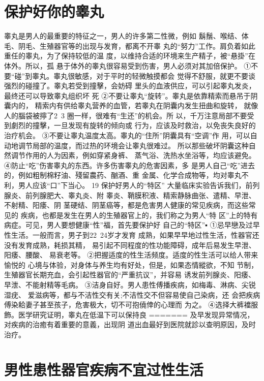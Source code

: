 \documentclass[12pt,UTF8]{ctexbook}
\begin{document}
\section{保护好你的睾丸}
睾丸是男人的最重要的特征之一，男人的许多第二性微，例如
鬍鬚、喉结、体毛、阴毛、生殖器官等的出现与发育，都离不开睾
丸的“努力”工作。肩负着如此重任的睾丸，为了保持较低的温
度，以维持合适的环境来生产精子，被“悬掛”在体外。所以，孤
悬于体外的睾丸很容易受到伤害，男人必须对其加倍保护。
①不要“碰”到睾丸。睾丸很敏感，对于平时的轻微触摸都会
觉得不舒服，就更不要谈强烈的碰撞了。睾丸若受到撞擊，会妨碍
里头的血液供应，可以引起睾丸发炎，最终还可以导致睾丸组织坏
死
②不要让睾丸“旋转”。睾丸是依靠精索而悬吊于阴囊内的，
精索内有供给睾丸营养的血管，若睾丸在阴囊内发生扭曲和旋转，
就像人的腦袋被擰了2~3 圈一样，很难有“生还”的机会。所
以，千万注意局部不要受到劇烈的撞擊，一旦发现有旋转的倾向或
行为，应该及时救治，以免丧失良好的治疗机会。
③不要让睾丸温度太高。睾丸的“住所”阴囊具有“空调”作
用，可以自动地调节局部的温度，而过热的环境会让睾丸很难过。
所以那些破坏阴囊这种自然调节作用的人为因素，例如穿紧身裤、
蒸气浴、洗热水坐浴等，均应该避免。
④防止“吃”伤害睾丸的东西。许多伤害睾丸的危害因素，多
是男人自己“吃”进去的，例如粗制棉籽油、殘留農药、酗酒、重
金属、化学合成物等，均对睾丸不利，男人应该“口”下当心。
19 保护好男人的“特区”
大量临床实验告诉我们，前列腺炎、前列腺肥大、睾丸炎、附
睾炎、鞘膜积液、精索静脉曲张、遣精、早泄、不射精、阳痿、阴
茎硬结、阴茎癌等，都是危害男人健康的常见疾病，而这些常见的
疾病，也都是发生在男人的生殖器官上的，我们称之为男人“特
区”上的特有病症。可见，男人要想健康“性”福，首先要保护好
自己的“特区”▪
①忌早戀及过早性生活。一般而言，男子到22~24岁才发育
成熟，如果早早地过性生活，性器官还没有发育成熟，耗损其精，
易引起不同程度的性功能障碍，成年后易发生早泄、阳痿、腰酸、
易衰老等。
②把握适度的性生活频度。适度的性生活可以给人带来愉悦的
心境与体验，对身体与养生均有好处，但是，如果态情縱欲，不知
节制，生殖器官长期充血，会引起性器官的“严重抗议”，并容易
诱发前列腺炎、阳痿、早泄、不能射精等毛病。
③洁身自好。男人患性傅播疾病，如梅毒、淋病、尖锐湿疣、
爱滋病等，都与不洁性交有关;不洁性交不但容易使自己染病，还
会把疾病傅染耠妻子甚至孩子，危害极大，切不可抱僥倖的心理而
为之。
④选择大裤襠服飾。医学研究证明，睾丸在低温下可以保持良
=======
及早发现异常情况，对疾病的治癒有着重要的意義，出现阴
道出血最好到医院就診以查明原因，及时治疗。

\section{男性患性器官疾病不宜过性生活}
\end{document}
